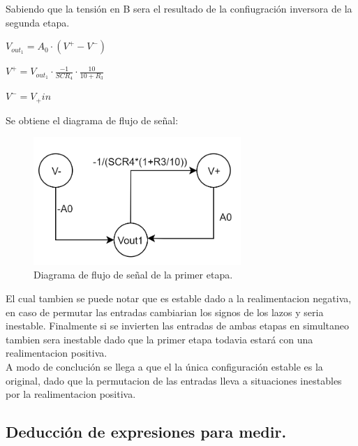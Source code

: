 Sabiendo que la tensión en B sera el resultado de la confiugración inversora de la segunda etapa.\\
\begin{center}$V_{out_1}=A_0 \cdot (V^+ - V^-)$\\\end{center}
\begin{center}$V^+= V_{out_1}\cdot \frac{-1}{SCR_4} \cdot \frac{10}{10+R_3} $\\\end{center}
\begin{center}$V^- = V_+{in}$\\\end{center}
Se obtiene el diagrama de flujo de señal:
\begin{figure}[H]	
	\centering
	\includegraphics[width=0.7\textwidth]{Ejercicio3/imagenes/PrimerEtapaDiagrama.PNG}
	\caption{Diagrama de flujo de señal de la primer etapa.}
	\label{fig:PrimerEtapaDiagrama}
\end{figure}
El cual tambien se puede notar que es estable dado a la realimentacion negativa, en caso de permutar las entradas cambiarian los signos de los lazos y seria inestable.
Finalmente si se invierten las entradas de ambas etapas en simultaneo tambien sera inestable dado que la primer etapa todavia estará con una realimentacion positiva.\\
A modo de conclución se llega a que el la única configuración estable es la original, dado que la permutacion de las entradas lleva a situaciones inestables por la realimentacion positiva.
\subsection{Deducción de expresiones para medir.}

